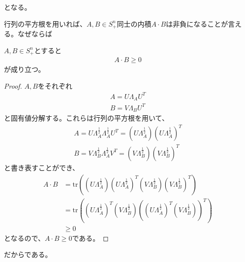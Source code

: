 となる。

行列の平方根を用いれば、$A, B \in S_+^n$同士の内積$A \cdot B$は非負になることが言える。なぜならば
\begin{theorem} \label{SemidefiniteInnerProduct}
  $A, B \in S_+^n$とすると
  \begin{align*}
    A \cdot B \geq 0
  \end{align*}
  が成り立つ。
\end{theorem}
\begin{proof}
  $A, B$をそれぞれ
  \begin{align*}
    A = U \Lambda_A U^T \\
    B = V \Lambda_B U^T
  \end{align*}
  と固有値分解する。これらは行列の平方根を用いて、
  \begin{align*}
    A = U \Lambda_A^\frac{1}{2} \Lambda_A^\frac{1}{2} U^T = (U \Lambda_A^\frac{1}{2}) (U \Lambda_A^\frac{1}{2})^T\\
    B = V \Lambda_B^\frac{1}{2} \Lambda_A^\frac{1}{2} V^T = (V \Lambda_B^\frac{1}{2}) (V \Lambda_B^\frac{1}{2})^T
  \end{align*}
  と書き表すことができ、
  \begin{align*}
    A \cdot B & = \mathrm{tr}\left((U \Lambda_A^\frac{1}{2}) (U \Lambda_A^\frac{1}{2})^T (V \Lambda_B^\frac{1}{2}) (V \Lambda_B^\frac{1}{2})^T\right) \\
              & = \mathrm{tr}\left((U \Lambda_A^\frac{1}{2})^T (V \Lambda_B^\frac{1}{2}) \left((U \Lambda_A^\frac{1}{2})^T (V \Lambda_B^\frac{1}{2})\right)^T\right) \\
              & \geq 0
  \end{align*}
  となるので、$A \cdot B \geq 0$である。
\end{proof}
だからである。

